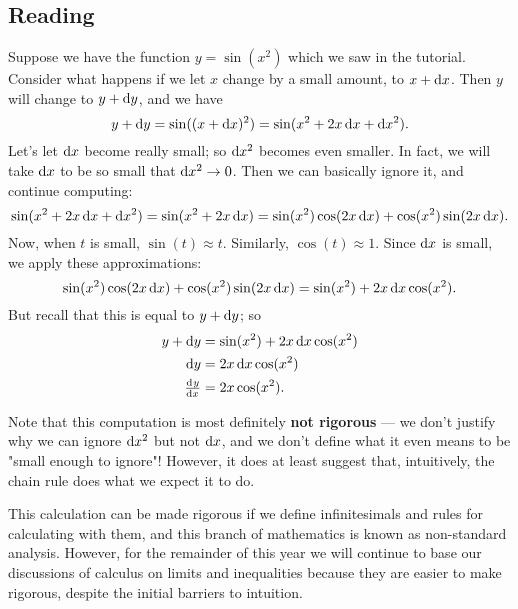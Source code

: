 


\subsection*{Reading}
Suppose we have the function $ y = \sin(x^2) $ which we saw in the tutorial. Consider
what happens if we let $ x $ change by a small amount, to $ x + \dif{x} $. Then $ y $
will change to $ y + \dif{y} $, and we have
\begin{displaymath}
  y + \dif{y} = \sin((x + \dif{x})^2) = \sin(x^2 + 2 x\dif{x} + \dif{x}^2).
\end{displaymath}
Let's let $ \dif{x} $ become really small; so $ \dif{x}^2 $ becomes even smaller. In fact, we
will take $ \dif{x} $ to be so small that $ \dif{x}^2 \to 0 $. Then we can basically ignore
it, and continue computing:
\begin{displaymath}
  \sin(x^2 + 2 x\dif{x} + \dif{x}^2) = \sin(x^2 + 2 x\dif{x}) = \sin(x^2) \cos(2x\dif{x}) + \cos(x^2) \sin(2x \dif{x}).
\end{displaymath}
Now, when $ t $ is small, $ \sin(t) \approx t $. Similarly, $ \cos(t) \approx 1 $. Since $ \dif{x} $ is small,
we apply these approximations:
\begin{displaymath}
  \sin(x^2) \cos(2x\dif{x}) + \cos(x^2) \sin(2x \dif{x}) = \sin(x^2) + 2x\dif{x} \cos(x^2).
\end{displaymath}
But recall that this is equal to $ y + \dif{y} $; so
\begin{align*}
  y + \dif{y} &= \sin(x^2) + 2x\dif{x} \cos(x^2)\\
  \dif{y} &= 2x \dif{x} \cos(x^2)\\
  \od{y}{x} &= 2x \cos(x^2).
\end{align*}

Note that this computation is most definitely \textbf{not rigorous} --- we don't justify why we can
ignore $ \dif{x}^2 $ but not $ \dif{x} $, and we don't define what it even means to be "small enough
to ignore"! However, it does at least suggest that, intuitively, the chain rule does what we expect it
to do.

This calculation can be made rigorous if we define infinitesimals and rules for calculating with them,
and this branch of mathematics is known as non-standard analysis. However, for the remainder of this
year we will continue to base our discussions of calculus on limits and inequalities because they are
easier to make rigorous, despite the initial barriers to intuition.

